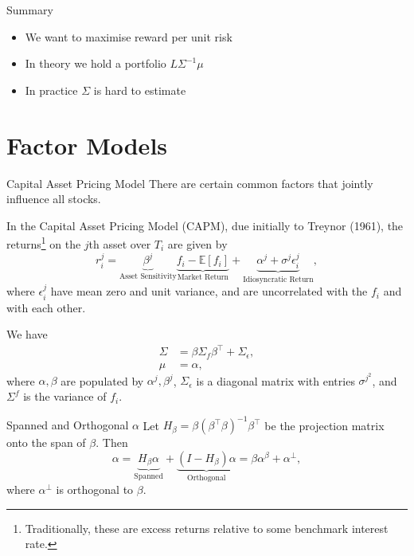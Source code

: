 \documentclass{beamer}
\newcommand{\sectionquote}[1]{\def\insertsquote{#1}}
\newcommand{\insertsquote}{}
\renewcommand{\insertsquote}{}
\begin{document}
\begin{frame}{Summary}
	\begin{itemize}
		\item We want to maximise reward per unit risk
		\item In theory we hold a portfolio $L\Sigma^{-1}\mu$
		\item In practice $\Sigma$ is hard to estimate
	\end{itemize}
\end{frame}

\sectionquote{``Every researcher has their own research process. This is part of their competitive advantage; it's indeed part of what they are, of thoughts and learned lessons accumulated over a lifetime of experiences and studying.'' Giuseppe Paleologo}
\section{Factor Models}
\begin{frame}{Capital Asset Pricing Model}
	There are certain common factors that jointly influence all stocks.

	In the Capital Asset Pricing Model (CAPM), due initially to Treynor (1961), the returns\footnote{Traditionally, these are excess returns relative to some benchmark interest rate.} on the $j$th asset over $T_i$ are given by
	$$r_i^j = \underbrace{\beta^j}_{\textrm{Asset Sensitivity}} \underbrace{f_i-\mathbb{E}[f_i]}_{\textrm{Market Return}} + \underbrace{\alpha^j + \sigma^j\epsilon_i^j}_{\textrm{Idiosyncratic Return}},$$ 
	where $\epsilon_i^j$ have mean zero and unit variance, and are uncorrelated with the $f_i$ and with each other.

	We have
	\begin{align*}
		\Sigma	&= \beta \Sigma_f \beta^\top + \Sigma_\epsilon,
	\\	\mu	&= \alpha,
	\end{align*}
	where $\alpha,\beta$ are populated by $\alpha^j,\beta^j$, $\Sigma_\epsilon$ is a diagonal matrix with entries $\sigma^j^2$, and $\Sigma^f$ is the variance of $f_i$.
\end{frame}

\begin{frame}{Spanned and Orthogonal $\alpha$}
	Let $H_\beta=\beta (\beta^\top \beta)^{-1}\beta^\top$ be the projection matrix onto the span of $\beta$. Then
	$$\alpha = \underbrace{H_\beta\alpha}_{\textrm{Spanned}} + \underbrace{(I-H_\beta) \alpha}_{\textrm{Orthogonal}} = \beta \alpha^\beta + \alpha^\bot,$$
	where $\alpha^\bot$ is orthogonal to $\beta$.
\end{frame}
\end{document}
